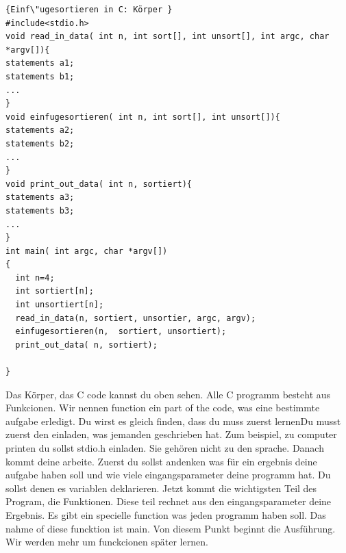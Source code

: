 \documentclass{article}[12pt]
\begin{document}



\begin{lstlisting}{Einf\"ugesortieren in C: Körper }
#include<stdio.h>
void read_in_data( int n, int sort[], int unsort[], int argc, char *argv[]){
statements a1;
statements b1;
...
}
void einfugesortieren( int n, int sort[], int unsort[]){
statements a2;
statements b2;
...
}
void print_out_data( int n, sortiert){
statements a3;
statements b3;
...
}
int main( int argc, char *argv[])
{
  int n=4;
  int sortiert[n];
  int unsortiert[n];
  read_in_data(n, sortiert, unsortier, argc, argv);
  einfugesortieren(n,  sortiert, unsortiert);
  print_out_data( n, sortiert);

}
\end{lstlisting}
Das Körper, das C code kannst du oben sehen. Alle C programm besteht aus Funkcionen. Wir nennen function ein part of the code, was eine
bestimmte aufgabe erledigt. 
Du wirst es gleich finden, dass du muss zuerst lernenDu musst zuerst den einladen, was jemanden
geschrieben hat. Zum beispiel, zu computer printen du sollst stdio.h einladen. Sie
gehören nicht zu den sprache. Danach kommt deine arbeite. Zuerst du sollst andenken was für ein ergebnis deine aufgabe haben soll und
wie viele eingangsparameter deine programm hat. Du sollst denen es variablen deklarieren. Jetzt kommt die wichtigsten Teil des Program, die
Funktionen. Diese teil rechnet aus den eingangsparameter deine Ergebnis. Es gibt ein specielle function was jeden programm haben
soll. Das nahme of diese funcktion ist main. Von diesem Punkt beginnt die Ausführung. Wir werden mehr um funckcionen später lernen.
 
\end{document}
